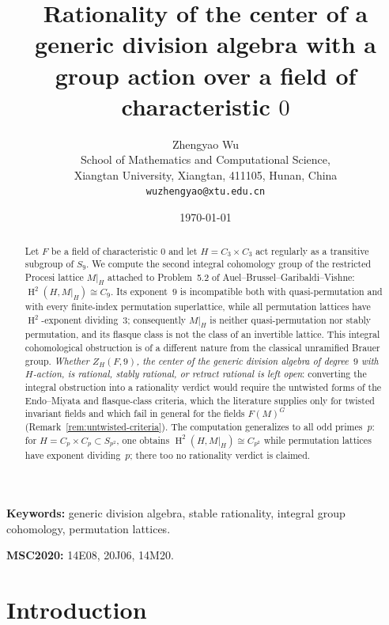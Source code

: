 \documentclass[12pt,a4paper]{article}
\title{\bfseries Rationality of the center of a generic division algebra with a
group action over a field of characteristic \(0\)}
\author{Zhengyao Wu\\
  School of Mathematics and Computational Science,\\
  Xiangtan University, Xiangtan, 411105, Hunan, China\\
  \texttt{wuzhengyao@xtu.edu.cn}}
\date{\today}
\theoremstyle{definition}
\DeclareMathOperator{\Br}{Br}
\DeclareMathOperator{\coh}{H}
\begin{document}
\maketitle

\begin{abstract}
Let \(F\) be a field of characteristic \(0\) and let
\(H = C_3 \times C_3\) act regularly as a transitive subgroup of \(S_9\).
We compute the second integral cohomology group of the restricted
Procesi lattice \(M|_H\) attached to Problem~5.2 of
Auel--Brussel--Garibaldi--Vishne: \(\coh^2(H, M|_H) \cong C_9\).  Its
exponent~\(9\) is incompatible both with quasi-permutation and with
every finite-index permutation superlattice, while all permutation
lattices have \(\coh^2\)-exponent dividing~\(3\); consequently \(M|_H\)
is neither quasi-permutation nor stably permutation, and its flasque
class is not the class of an invertible lattice.  This integral
cohomological obstruction is of a different nature from the classical
unramified Brauer group.  \emph{Whether \(Z_H(F,9)\), the center of the
generic division algebra of degree~\(9\) with \(H\)-action, is rational,
stably rational, or retract rational is left open}: converting the
integral obstruction into a rationality verdict would require the
untwisted forms of the Endo--Miyata and flasque-class criteria, which the
literature supplies only for twisted invariant fields and which fail in
general for the fields \(F(M)^G\)
(Remark~\ref{rem:untwisted-criteria}).
The computation generalizes to all odd primes~\(p\):
for \(H = C_p \times C_p \subset S_{p^2}\),
one obtains \(\coh^2(H, M|_H) \cong C_{p^2}\) while permutation lattices
have exponent dividing~\(p\); there too no rationality verdict is
claimed.
\end{abstract}

\medskip\noindent
\textbf{Keywords:} generic division algebra, stable rationality,
integral group cohomology, permutation lattices.

\medskip\noindent
\textbf{MSC2020:} 14E08, 20J06, 14M20.

\newpage
\tableofcontents
\newpage

\section{Introduction}
\end{document}

